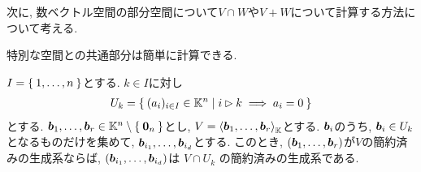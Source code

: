 次に, 数ベクトル空間の部分空間について$V\cap W$や$V+W$について計算する方法について考える.

特別な空間との共通部分は簡単に計算できる.
\begin{prop}
  $I=\Set{1,\ldots, n}$とする.
  $k\in I$に対し
  \begin{align*}
    U_k=\Set{(a_i)_{i\in I}\in\mathbb{K}^n| i\rhd k \implies a_i=0}
  \end{align*}
  とする.
  $\boldsymbol{b}_1,\ldots,\boldsymbol{b}_r \in \mathbb{K}^n \setminus\Set{\boldsymbol{0}_n}$とし,
  $V=\Braket{\boldsymbol{b}_1,\ldots,\boldsymbol{b}_r}_{\mathbb{K}}$とする.
  $\boldsymbol{b}_i$のうち, $\boldsymbol{b}_i\in U_k$となるものだけを集めて,
  $\boldsymbol{b}_{i_1},\ldots, \boldsymbol{b}_{i_d}$とする.
  このとき,
  $(\boldsymbol{b}_1,\ldots,\boldsymbol{b}_r)$が$V$の簡約済みの生成系ならば,
  $(\boldsymbol{b}_{i_1},\ldots, \boldsymbol{b}_{i_d})$は
  $V\cap U_k$
  の簡約済みの生成系である.
  
\end{prop}
